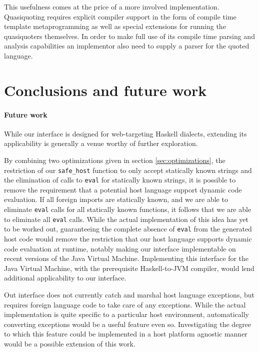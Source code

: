 \documentclass[preprint]{sigplanconf}
\begin{document}
This usefulness comes at the price of a more involved implementation.
Quasiquoting requires explicit compiler support in the form of
compile time template metaprogramming as well as special extensions for running
the quasiquoters themselves.
In order to make full use of its compile time parsing and analysis capabilities
an implementor also need to supply a parser for the quoted language.

\section{Conclusions and future work}
\label{sec:conclusion}
\paragraph{Future work}
While our interface is designed for web-targeting Haskell dialects, extending
its applicability is generally a venue worthy of further exploration.

By combining two optimizations given in section \ref{sec:optimizations},
the restriction of our \lstinline!safe_host! function to only accept statically
known strings and the elimination of calls to \lstinline!eval! for statically
known strings, it is possible to remove the requirement that a potential
host language support dynamic code evaluation.
If all foreign imports are statically known,
and we are able to eliminate \lstinline!eval! calls for all statically known
functions, it follows that we are able to eliminate all \lstinline!eval! calls.
While the actual implementation of this idea has yet to be worked out,
guaranteeing the complete absence of \lstinline!eval! from the generated host
code would remove the restriction that our host language supports dynamic code
evaluation at runtime, notably making our interface implementable on
recent versions of the Java Virtual Machine.
Implementing this interface for the Java Virtual Machine, with the
prerequisite Haskell-to-JVM compiler, would lend additional applicability to
our interface.

Out interface does not currently catch and marshal host language
exceptions, but requires foreign language code to take care of any exceptions.
While the actual implementation is quite specific to a particular
host environment, automatically converting exceptions would be a useful feature
even so. Investigating the degree to which this feature could be implemented
in a host platform agnostic manner would be a possible extension of this work.
\end{document}
